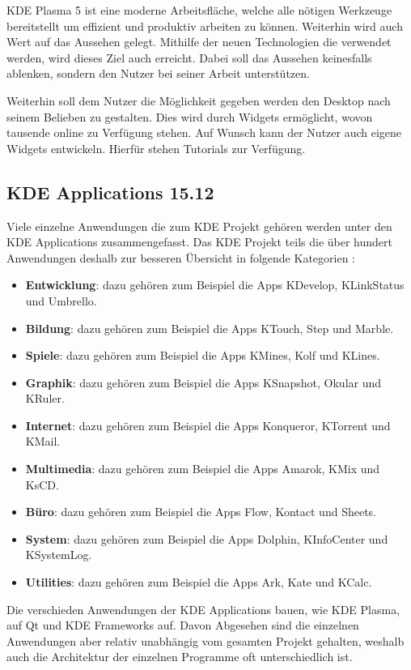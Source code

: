 KDE Plasma 5 ist eine moderne Arbeitsfläche, welche alle nötigen Werkzeuge bereitstellt um effizient und produktiv arbeiten zu können. Weiterhin wird auch Wert auf das Aussehen gelegt. Mithilfe der neuen Technologien die verwendet werden, wird dieses Ziel auch erreicht. Dabei soll das Aussehen keinesfalls ablenken, sondern den Nutzer bei seiner Arbeit unterstützen. \cite{KDEPlasma}

Weiterhin soll dem Nutzer die Möglichkeit gegeben werden den Desktop nach seinem Belieben zu gestalten. Dies wird durch Widgets ermöglicht, wovon tausende online zu Verfügung stehen. Auf Wunsch kann der Nutzer auch eigene Widgets entwickeln. Hierfür stehen Tutorials zur Verfügung.


\subsection{KDE Applications 15.12}
Viele einzelne Anwendungen die zum KDE Projekt gehören werden unter den KDE Applications zusammengefasst. Das KDE Projekt teils die über hundert Anwendungen deshalb zur besseren Übersicht in folgende Kategorien \cite{KDEApps}:

\begin{itemize}
	\item \textbf{Entwicklung}: dazu gehören zum Beispiel die Apps KDevelop, KLinkStatus und Umbrello.
	\item \textbf{Bildung}: dazu gehören zum Beispiel die Apps KTouch, Step und Marble.
	\item \textbf{Spiele}: dazu gehören zum Beispiel die Apps KMines, Kolf und KLines.
	\item \textbf{Graphik}: dazu gehören zum Beispiel die Apps KSnapshot, Okular und KRuler.
	\item \textbf{Internet}: dazu gehören zum Beispiel die Apps Konqueror, KTorrent und KMail.
	\item \textbf{Multimedia}: dazu gehören zum Beispiel die Apps Amarok, KMix und KsCD.
	\item \textbf{Büro}: dazu gehören zum Beispiel die Apps Flow, Kontact und Sheets.
	\item \textbf{System}: dazu gehören zum Beispiel die Apps Dolphin, KInfoCenter und KSystemLog.
	\item \textbf{Utilities}: dazu gehören zum Beispiel die Apps Ark, Kate und KCalc.
\end{itemize}

Die verschieden Anwendungen der KDE Applications bauen, wie KDE Plasma, auf Qt und KDE Frameworks auf. Davon Abgesehen sind die einzelnen Anwendungen aber relativ unabhängig vom gesamten Projekt gehalten, weshalb auch die Architektur der einzelnen Programme oft unterschiedlich ist. 



